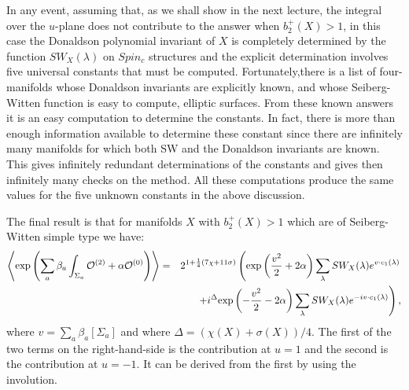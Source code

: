 \documentclass[10pt]{article}
\begin{document}
In any event, assuming that, as we shall show in the next lecture,
the integral over 
the $u$-plane does not contribute to the answer when $b_2^+(X)>1$, in
this case the Donaldson polynomial invariant of $X$ is completely
determined by the function $SW_X(\lambda)$ on $Spin_c$ structures and
the explicit determination involves five universal constants that must
be computed.
Fortunately,there is a list of four-manifolds whose Donaldson
invariants are explicitly known, and whose Seiberg-Witten function is
easy to compute, elliptic surfaces.  From these known answers it is an
easy computation to determine the constants.
In fact, there is more than enough information available to determine
these constant since there are infinitely many manifolds for which
both SW and the Donaldson invariants are known.  This gives infinitely
redundant determinations of the constants and gives then infinitely
many checks on the method.  All these computations produce the same
values for the five unknown constants in the above discussion.

The final result is that for manifolds $X$ with $b_2^+(X)>1$ which are
of Seiberg-Witten simple type we have:
\begin{eqnarray*}
\left\langle{\rm exp}\left(\sum_a\beta_a\int_{\Sigma_a}{\cal
O}^{(2)} + \alpha{\cal
O}^{(0)}\right)\right\rangle & = &
2^{1+\frac{1}{4}(7\chi+11\sigma)}\left( {\rm 
exp}\left(\frac{v^2}{2} +2\alpha\right)\sum_\lambda SW_X(\lambda)e^{v\cdot
c_1(\lambda)}\right. \\
& & \left. +i^\Delta{\rm
exp}\left(-\frac{v^2}{2}-2\alpha\right)\sum_\lambda SW_X(\lambda)
e^{-iv\cdot c_1(\lambda)}\right),
\end{eqnarray*} 
where $v=\sum_a\beta_a[\Sigma_a]$ and where
$\Delta=(\chi(X)+\sigma(X))/4$. 
The first of the two terms on the right-hand-side is the contribution
at $u=1$ and the second 
is the contribution at $u=-1$.  It can be derived from the first by
using the involution.
\end{document}
